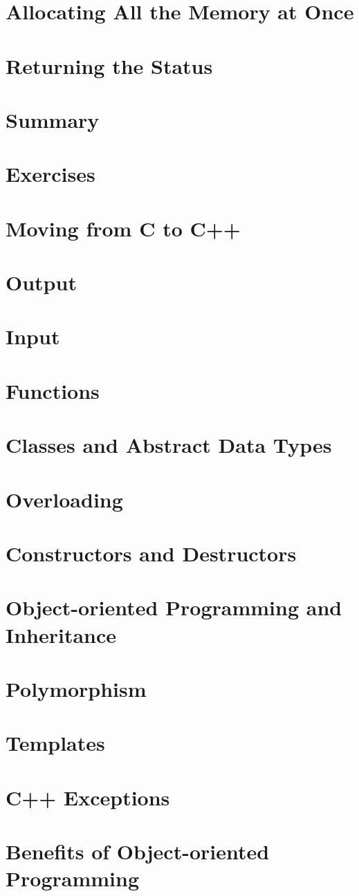\documentclass[12pt]{book}
\begin{document}
\section{Allocating All the Memory at Once}
\section{Returning the Status}
\section{Summary}
\section{Exercises}

\section{Moving from C to C++}

\section{Output}
\section{Input}
\section{Functions}
\section{Classes and Abstract Data Types}
\section{Overloading}
\section{Constructors and Destructors}
\section{Object-oriented Programming and Inheritance}
\section{Polymorphism}
\section{Templates}
\section{C++ Exceptions}
\section{Benefits of Object-oriented Programming}
\end{document}
